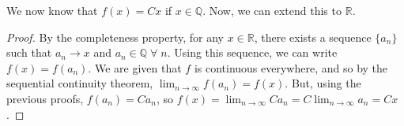 We now know that $f(x) = Cx$ if $x \in \mathbb{Q}$. Now, we can extend this to $\mathbb{R}$.

\begin{proof}
  By the completeness property, for any $x \in \mathbb{R}$, there exists a sequence $\{a_n\}$ such that $a_n \rightarrow x$ and $a_n \in \mathbb{Q} \;\forall\;n$. Using this sequence, we can write $f(x) = f( a_n)$. We are given that $f$ is continuous everywhere, and so by the sequential continuity theorem, $\lim_{n \rightarrow \infty} f(a_n) = f(x)$. But, using the previous proofs, $f(a_n) = Ca_n$, so $f(x) = \lim_{n \rightarrow \infty} Ca_n = C \lim_{n \rightarrow \infty} a_n = Cx$.
\end{proof}


